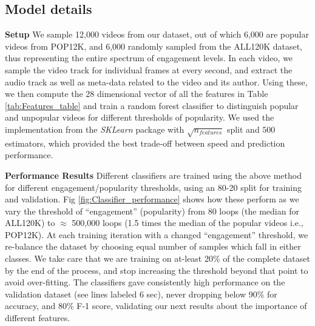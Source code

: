 \subsection{Model details}
\label{sec:model-details}
\noindent\textbf{Setup}
We sample 12,000 videos from our dataset, out of which 6,000 are popular videos from  POP12K, and 6,000 randomly sampled from the ALL120K dataset, thus representing the entire spectrum of engagement levels. In each video, we sample the video track for individual frames at every second, and extract the audio track as well as meta-data related to the video and its author. Using these, we then compute the 28 dimensional vector of all the features in Table \ref{tab:Features_table} and train a random forest classifier to distinguish popular and unpopular videos for different thresholds of popularity. We used the implementation from the \emph{SKLearn} package with $\sqrt{n_{features}}$ split and $500$ estimators, which provided the best trade-off between speed and prediction performance.
 
\noindent\textbf{Performance Results} 
Different classifiers are trained using the above method for different engagement/popularity thresholds, using an 80-20 split for training and validation. Fig \ref{fig:Classifier_performance} shows how these perform as we vary the threshold of ``engagement'' (popularity) from 80 loops (the median for ALL120K) to  $\approx$ 500,000 loops (1.5 times the median of the popular videos i.e., POP12K). At each training iteration with a changed ``engagement'' threshold, we re-balance the dataset by choosing equal number of samples which fall in either classes. We take care that we are training on at-least 20\% of the complete dataset by the end of the process, and stop increasing the threshold beyond that point to avoid over-fitting. The classifiers gave consistently high performance on the validation dataset (see lines labeled 6 sec), never dropping below 90\% for accuracy, and 80\% F-1 score, validating our next results about the importance of different features. 

